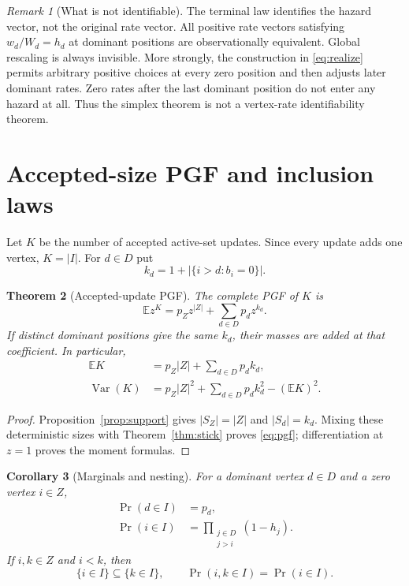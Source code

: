 \documentclass[10pt,a4paper]{amsart}
\newtheorem{theorem}{Theorem}[section]
\newtheorem{corollary}[theorem]{Corollary}
\theoremstyle{remark}
\newtheorem{remark}[theorem]{Remark}
\begin{document}
\begin{remark}[What is not identifiable]\label{rem:nonid}
The terminal law identifies the hazard vector, not the original rate vector.
All positive rate vectors satisfying $w_d/W_d=h_d$ at dominant positions are
observationally equivalent.  Global rescaling is always invisible.  More
strongly, the construction in \eqref{eq:realize} permits arbitrary positive
choices at every zero position and then adjusts later dominant rates.  Zero
rates after the last dominant position do not enter any hazard at all.  Thus
the simplex theorem is not a vertex-rate identifiability theorem.
\end{remark}

\section{Accepted-size PGF and inclusion laws}

Let $K$ be the number of accepted active-set updates.  Since every update adds
one vertex, $K=|I|$.  For $d\in D$ put
\begin{equation}\label{eq:kd}
 k_d=1+|\{i>d:b_i=0\}|.
\end{equation}

\begin{theorem}[Accepted-update PGF]\label{thm:pgf}
The complete PGF of $K$ is
\begin{equation}\label{eq:pgf}
 \mathbb E z^K=p_Zz^{|Z|}+\sum_{d\in D}p_dz^{k_d}.
\end{equation}
If distinct dominant positions give the same $k_d$, their masses are added at
that coefficient.  In particular,
\begin{align}
 \mathbb EK&=p_Z|Z|+\sum_{d\in D}p_dk_d,\label{eq:meanK}\\
 \operatorname{Var}(K)&=p_Z|Z|^2+\sum_{d\in D}p_dk_d^2-(\mathbb EK)^2.
 \label{eq:varK}
\end{align}
\end{theorem}

\begin{proof}
Proposition~\ref{prop:support} gives $|S_Z|=|Z|$ and $|S_d|=k_d$.
Mixing these deterministic sizes with Theorem~\ref{thm:stick} proves
\eqref{eq:pgf}; differentiation at $z=1$ proves the moment formulas.
\end{proof}

\begin{corollary}[Marginals and nesting]\label{cor:marginal}
For a dominant vertex $d\in D$ and a zero vertex $i\in Z$,
\begin{align}
 \Pr(d\in I)&=p_d,                                      \label{eq:dom-marginal}\\
 \Pr(i\in I)&=\prod_{\substack{j\in D\\j>i}}(1-h_j).
                                                               \label{eq:zero-marginal}
\end{align}
If $i,k\in Z$ and $i<k$, then
\begin{equation}\label{eq:nesting}
 \{i\in I\}\subseteq\{k\in I\},\qquad
 \Pr(i,k\in I)=\Pr(i\in I).
\end{equation}
\end{corollary}
\end{document}
